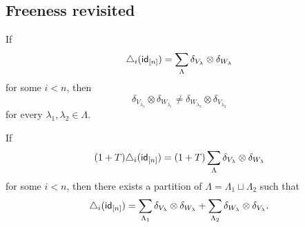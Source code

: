 \subsection{Freeness revisited}


\begin{lemma} \label{lemma: freeness recasted}
	If
	\[
	\triangle_i(\mathsf{id}_{[n]}) = \sum_{\Lambda} \delta_{V_\lambda} \otimes \delta_{W_\lambda}
	\]
	for some $i < n$, then
	\[
	\delta_{V_{\lambda_1}} \otimes \delta_{W_{\lambda_1}} \neq
	\delta_{W_{\lambda_2}} \otimes \delta_{V_{\lambda_2}}
	\]
	for every $\lambda_1, \lambda_2 \in \Lambda$.
\end{lemma}


\begin{lemma} \label{lemma: (1+T) triangle = 0 implies triangle = 0}
    If
    \[
    (1 + T) \triangle_i(\mathsf{id}_{[n]}) = (1 + T) \sum_{\Lambda} \delta_{V_\lambda} \otimes \delta_{W_\lambda}
    \]
    for some $i < n$, then there exists a partition of $\Lambda = \Lambda_1 \sqcup \Lambda_2$ such that
    \begin{equation} \label{equation: splitting after 1+T}
    \triangle_i(\mathsf{id}_{[n]}) = \sum_{\Lambda_1} \delta_{V_\lambda} \otimes \delta_{W_\lambda} + \sum_{\Lambda_2} \delta_{W_\lambda} \otimes \delta_{V_\lambda}.
    \end{equation}
\end{lemma}

